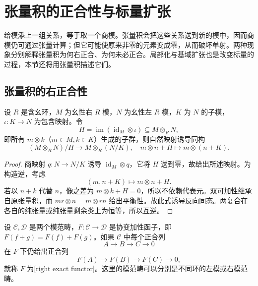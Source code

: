 
\section{张量积的正合性与标量扩张}
\label{b2:sec:0604}

给模添上一组关系，等于取一个商模。张量积会把这些关系送到新的模中，因而商模仍可通过张量计算；但它可能使原来非零的元素变成零，从而破坏单射。两种现象分别解释张量积为何右正合、为何未必正合。局部化与基域扩张也是改变标量的过程，本节还将用张量积描述它们。

%
%
%

\subsection{张量积的右正合性}
\label{b2:subsec:0604:01}

\begin{lemma}\label{b2:lem:tensor-cokernel}
	设 \(R\) 是含幺环，\(M\) 为幺性右 \(R\) 模，\(N\) 为幺性左 \(R\) 模，\(K\) 为 \(N\) 的子模，\(\iota:K\to N\) 为包含映射。令
	\[
		H=\operatorname{im}(\operatorname{id}_M\otimes\iota) \subseteq M\otimes_RN,
	\]
	即所有 \(m\otimes k\)（\(m\in M,k\in K\)）生成的子群，则自然映射诱导同构
	\[
		(M\otimes_RN)/H\longrightarrow M\otimes_R(N/K), \quad m\otimes n+H\longmapsto m\otimes(n+K).
	\]
\end{lemma}
\begin{proof}
	商映射 \(q:N\to N/K\) 诱导 \(\operatorname{id}_M\otimes q\)，它将 \(H\) 送到零，故给出所述映射。为构造逆，考虑
	\[
		(m,n+K)\longmapsto m\otimes n+H.
	\]
	若以 \(n+k\) 代替 \(n\)，像之差为 \(m\otimes k+H=0\)，所以不依赖代表元。双可加性继承自原张量积，而 \(mr\otimes n=m\otimes rn\) 给出平衡性。故此式诱导反向同态。两复合在各自的纯张量或纯张量剩余类上为恒等，所以互逆。
\end{proof}

\begin{definition}\label{b2:def:right-exact-functor}
	设 \(\mathcal C,\mathcal D\) 是两个模范畴，\(F:\mathcal C\to\mathcal D\) 是协变加性函子，即 \(F(f+g)=F(f)+F(g)\)。如果 \(\mathcal C\) 中每个正合列
	\[
		A\longrightarrow B\longrightarrow C\longrightarrow0
	\]
	在 \(F\) 下仍给出正合列
	\[
		F(A)\longrightarrow F(B)\longrightarrow F(C)\longrightarrow0,
	\]
	就称 \(F\) 为[right exact functor]。这里的模范畴可以分别是不同环的左模或右模范畴。
\end{definition}

